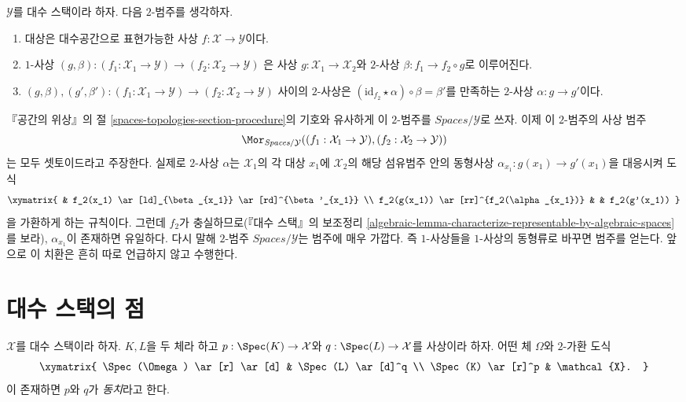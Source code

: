 \begin{remark}
\label{remark-representable-over}
$\mathcal{Y}$를 대수 스택이라 하자. 다음 $2$-범주를 생각하자.
\begin{enumerate}
\item 대상은 대수공간으로 표현가능한 사상
$f : \mathcal{X} \to \mathcal{Y}$이다.
\item $1$-사상
$(g, \beta) :
(f_1 : \mathcal{X}_1 \to \mathcal{Y})
\to
(f_2 : \mathcal{X}_2 \to \mathcal{Y})$
은 사상 $g : \mathcal{X}_1 \to \mathcal{X}_2$와
$2$-사상 $\beta : f_1 \to f_2 \circ g$로 이루어진다.
\item
$(g, \beta), (g', \beta') :
(f_1 : \mathcal{X}_1 \to \mathcal{Y})
\to
(f_2 : \mathcal{X}_2 \to \mathcal{Y})$
사이의 $2$-사상은
$(\text{id}_{f_2} \star \alpha) \circ \beta = \beta'$를 만족하는
$2$-사상 $\alpha : g \to g'$이다.
\end{enumerate}
『공간의 위상』의 절 \ref{spaces-topologies-section-procedure}의
기호와 유사하게 이 $2$-범주를 $\textit{Spaces}/\mathcal{Y}$로 쓰자.
이제 이 $2$-범주의 사상 범주
$$
\Mor_{\textit{Spaces}/\mathcal{Y}}(
(f_1 : \mathcal{X}_1 \to \mathcal{Y}),
(f_2 : \mathcal{X}_2 \to \mathcal{Y}))
$$
는 모두 셋토이드라고 주장한다. 실제로 $2$-사상 $\alpha$는
$\mathcal{X}_1$의 각 대상 $x_1$에 $\mathcal{X}_2$의 해당 섬유범주 안의
동형사상 $\alpha_{x_1} : g(x_1) \longrightarrow g'(x_1)$을 대응시켜
도식
$$
\xymatrix{
& f_2(x_1) \ar[ld]_{\beta_{x_1}} \ar[rd]^{\beta'_{x_1}} \\
f_2(g(x_1)) \ar[rr]^{f_2(\alpha_{x_1})} & &
f_2(g'(x_1))
}
$$
을 가환하게 하는 규칙이다. 그런데 $f_2$가 충실하므로(『대수 스택』의
보조정리
\ref{algebraic-lemma-characterize-representable-by-algebraic-spaces}를 보라),
$\alpha_{x_1}$이 존재하면 유일하다. 다시 말해 $2$-범주
$\textit{Spaces}/\mathcal{Y}$는 범주에 매우 가깝다. 즉 $1$-사상들을
$1$-사상의 동형류로 바꾸면 범주를 얻는다. 앞으로 이 치환은 흔히
따로 언급하지 않고 수행한다.
\end{remark}




\section{대수 스택의 점}
\label{section-points}

\noindent
$\mathcal{X}$를 대수 스택이라 하자. $K, L$을 두 체라 하고
$p : \Spec(K) \to \mathcal{X}$와
$q : \Spec(L) \to \mathcal{X}$를 사상이라 하자.
어떤 체 $\Omega$와 $2$-가환 도식
$$
\xymatrix{
\Spec(\Omega) \ar[r] \ar[d] &
\Spec(L) \ar[d]^q \\
\Spec(K) \ar[r]^p &
\mathcal{X}.
}
$$
이 존재하면 $p$와 $q$가 {\it 동치}라고 한다.

